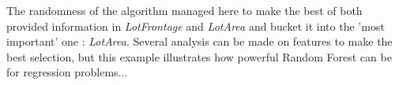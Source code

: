 \documentclass[english,11pt,openany]{report}
\theoremstyle{definition}
\newcommand\blankpage{%
	\null
	\thispagestyle{empty}%
	\addtocounter{page}{-1}%
	\newpage}
\theoremstyle{plain}
\theoremstyle{definition}
\begin{document}
\begin{appendices}
The randomness of the algorithm managed here to make the best of both provided information in \textit{LotFrontage} and \textit{LotArea} and bucket it into the 'most important' one : \textit{LotArea}. 
Several analysis can be made on features to make the best selection, but this example illustrates how powerful Random Forest can be for regression problems...


\end{appendices}

\blankpage


% 
\end{document}
